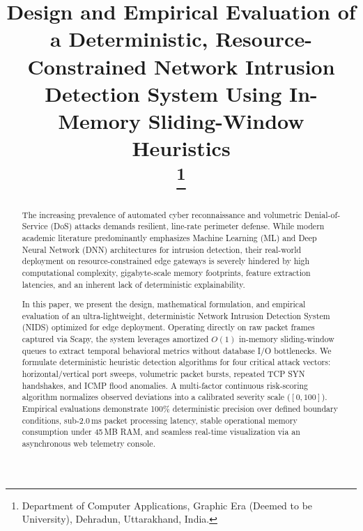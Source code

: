 \documentclass[conference]{IEEEtran}
\begin{document}
\title{Design and Empirical Evaluation of a Deterministic, Resource-Constrained Network Intrusion Detection System Using In-Memory Sliding-Window Heuristics\\
\thanks{Department of Computer Applications, Graphic Era (Deemed to be University), Dehradun, Uttarakhand, India.}
}

\author{
\and
{}
}

\maketitle

\begin{abstract}
The increasing prevalence of automated cyber reconnaissance and volumetric Denial-of-Service (DoS) attacks demands resilient, line-rate perimeter defense. While modern academic literature predominantly emphasizes Machine Learning (ML) and Deep Neural Network (DNN) architectures for intrusion detection, their real-world deployment on resource-constrained edge gateways is severely hindered by high computational complexity, gigabyte-scale memory footprints, feature extraction latencies, and an inherent lack of deterministic explainability. 

In this paper, we present the design, mathematical formulation, and empirical evaluation of an ultra-lightweight, deterministic Network Intrusion Detection System (NIDS) optimized for edge deployment. Operating directly on raw packet frames captured via Scapy, the system leverages amortized $O(1)$ in-memory sliding-window queues to extract temporal behavioral metrics without database I/O bottlenecks. We formulate deterministic heuristic detection algorithms for four critical attack vectors: horizontal/vertical port sweeps, volumetric packet bursts, repeated TCP SYN handshakes, and ICMP flood anomalies. A multi-factor continuous risk-scoring algorithm normalizes observed deviations into a calibrated severity scale ($[0, 100]$). Empirical evaluations demonstrate 100\% deterministic precision over defined boundary conditions, sub-2.0\,ms packet processing latency, stable operational memory consumption under 45\,MB RAM, and seamless real-time visualization via an asynchronous web telemetry console.
\end{abstract}
\end{document}
